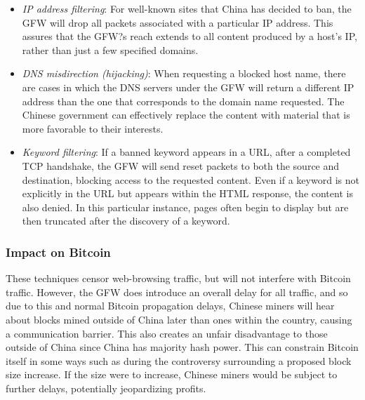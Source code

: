\begin{itemize}
\item \textit{IP address filtering}:
For well-known sites that China has decided to ban, the GFW will drop all packets associated with a particular IP address. This assures that the GFW?s reach extends to all content produced by a host's IP, rather than just a few specified domains.

\item \textit{DNS misdirection (hijacking)}:
When requesting a blocked host name, there are cases in which the DNS servers under the GFW will return a different IP address than the one that corresponds to the domain name requested. The Chinese government can effectively replace the content with material that is more favorable to their interests.

\item \textit{Keyword filtering}:
If a banned keyword appears in a URL, after a completed TCP handshake, the GFW will send reset packets to both the source and destination, blocking access to the requested content. Even if a keyword is not explicitly in the URL but appears within the HTML response, the content is also denied. In this particular instance, pages often begin to display but are then truncated after the discovery of a keyword.
\end{itemize}

\subsubsection{Impact on Bitcoin}
These techniques censor web-browsing traffic, but will not interfere with Bitcoin traffic. However, the GFW does introduce an overall delay for all traffic, and so due to this and normal Bitcoin propagation delays, Chinese miners will hear about blocks mined outside of China later than ones within the country, causing a communication barrier. This also creates an unfair disadvantage to those outside of China since China has majority hash power. This can constrain Bitcoin itself in some ways such as during the controversy surrounding a proposed block size increase. If the size were to increase, Chinese miners would be subject to further delays, potentially jeopardizing profits.




\cite{Xu2011}